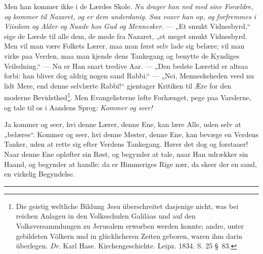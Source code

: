 \documentclass[12pt,a4paper]{book}
\begin{document}
Men han kommer ikke i de Lærdes Skole. \emph{Nu drager han ned med sine
Forældre, og kommer til Nazaret, og er dem underdanig. Saa voxer han op, og
forfremmes i Viisdom og Alder og Naade hos Gud og Mennesker.} --- „Et smukt
Vidnesbyrd,“ sige de Lærde til alle
dem, de møde fra Nazaret, „et meget smukt Vidnesbyrd. Men vil man være Folkets
Lærer, maa man først selv lade sig belære; vil man virke paa Verden, maa man
kjende dens Tankegang og benytte de Kyndiges Veiledning.“ --- Nu er Han snart
tredive Aar. --- „Den bedste Læretid er altsaa forbi: han bliver dog aldrig
nogen sand Rabbi.“ --- „Nei, Menneskeheden veed nu lidt Mere, end denne
selvlærte Rabbi!“ gjentager Kritiken til Ære for den moderne
Bevidsthed\footnote{%
Die geistig weltliche Bildung Jesu überschreitet dasjenige nicht, was bei
reichen Anlageu in den Volksschulen Galiläas und auf den Volksversammlungen zu
Jerusalem erworben werden konnte; andre, unter gebildeten Völkern und in
glücklicheren Zeiten geboren, waren ihm darin überlegen. \textit{Dr.} Karl Hase.
Kirchengeschichte. Leipz. 1834. S. 25 \S\ 83.%
}. Men Evangelisterne løfte Forhænget, pege paa Varslerne, og tale til os i
Aandens Sprog: \emph{Kommer og seer!}

Ja kommer og seer, hvi denne Lærer, denne Ene, kan lære Alle, uden selv at
„belæres“. Kommer og seer, hvi denne Mester, denne Ene, kan bevæge en Verdens
Tanker, uden at rette sig efter Verdens Tankegang. Hører det dog og forstaaer!
Naar denne Ene opløfter sin Røst, og begynder at tale, naar Han udrækker sin
Haand, og begynder at handle: da er Himmeriges Rige nær, da skeer der en sand,
en virkelig Begyndelse.

\begin{center}
  \rule{0.22\textwidth}{0.4pt}
\end{center}
\end{document}
